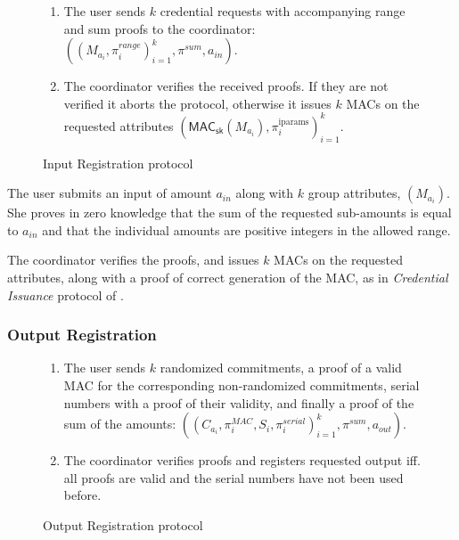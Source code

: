 \documentclass{article}
\begin{document}
\begin{figure}[h!]
    \begin{mdframed}
    \begin{enumerate}
        \item The user sends $k$ credential requests with accompanying range and sum proofs to the coordinator:  $((M_{a_i},\pi^{\textit{range}}_{i})^{k}_{i=1},\pi^{sum},a_{\textit{in}})$.
        \item The coordinator verifies the received proofs. If they are not verified it aborts the protocol, otherwise it issues $k$ MACs on the requested attributes $(\mathsf{MAC}_\mathsf{sk}(M_{a_i}), \pi_i^{\mathrm{iparams}})^{k}_{i=1}$.
    \end{enumerate}

\end{mdframed}
    \caption{Input Registration protocol}
    \label{fig:inputreg}
\end{figure}

The user submits an input of amount $a_{\mathit{in}}$ along with $k$ group attributes, $(M_{a_i})$.
She proves in zero knowledge that the sum of the requested sub-amounts is equal to $a_{\mathit{in}}$ and that the individual amounts are positive integers in the allowed range.

The coordinator verifies the proofs, and issues $k$ MACs on the requested attributes, along with a proof of correct generation of the MAC, as in \textit{Credential Issuance} protocol of \cite{chase2019signal}.

\subsubsection{Output Registration}

\begin{figure}[h!]
    \begin{mdframed}
    \begin{enumerate}
        \item The user sends $k$ randomized commitments, a proof of a valid MAC for the corresponding non-randomized commitments, serial numbers with a proof of their validity, and finally a proof of the sum of the amounts: $((C_{a_i},\pi_{i}^{\textit{MAC}},S_i,\pi_i^{\textit{serial}})^{k}_{i=1}, \pi^{\textit{sum}}, a_{\textit{out}})$.
        \item The coordinator verifies proofs and registers requested output iff. all proofs are valid and the serial numbers have not been used before.
    \end{enumerate}
\end{mdframed}
    \caption{Output Registration protocol}
    \label{fig:outputreg}
\end{figure}
\end{document}
